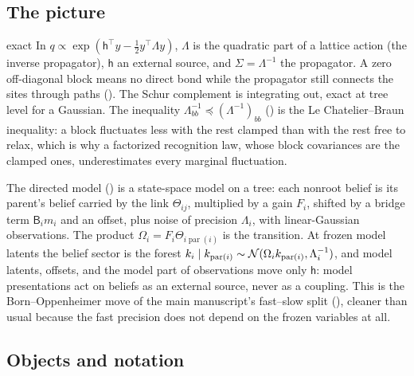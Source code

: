 \subsection{The picture}

\begin{analogy}{exact}
In \(q\propto\exp(\mathsf h^\top y-\tfrac12y^\top\Lambda y)\), \(\Lambda\) is the quadratic part of a
lattice action (the inverse propagator), \(\mathsf h\) an external source, and \(\Sigma=\Lambda^{-1}\)
the propagator. A zero off-diagonal block means no direct bond while the propagator still connects the
sites through paths (). The Schur complement is integrating out,
exact at tree level for a Gaussian. The inequality \(\Lambda_{bb}^{-1}\preceq(\Lambda^{-1})_{bb}\)
() is the Le Chatelier--Braun inequality: a block fluctuates less
with the rest clamped than with the rest free to relax, which is why a factorized recognition law, whose
block covariances are the clamped ones, underestimates every marginal fluctuation.
\end{analogy}

The directed model () is a state-space model on a tree: each nonroot belief is its
parent's belief carried by the link \(\Theta_{ij}\), multiplied by a gain \(F_i\), shifted by a bridge
term \(\mathsf B_im_i\) and an offset, plus noise of precision \(\Lambda_i\), with linear-Gaussian
observations. The product \(\Omega_i=F_i\Theta_{i\operatorname{par}(i)}\) is the transition. At frozen
model latents the belief sector is the forest
\(k_i\mid k_{\operatorname{par}(i)}\sim\mathcal N(\Omega_ik_{\operatorname{par}(i)},\Lambda_i^{-1})\),
and model latents, offsets, and the model part of observations move only \(\mathsf h\): model
presentations act on beliefs as an external source, never as a coupling. This is the Born--Oppenheimer
move of the main manuscript's fast--slow split (), cleaner than usual because the
fast precision does not depend on the frozen variables at all.

\subsection{Objects and notation}

